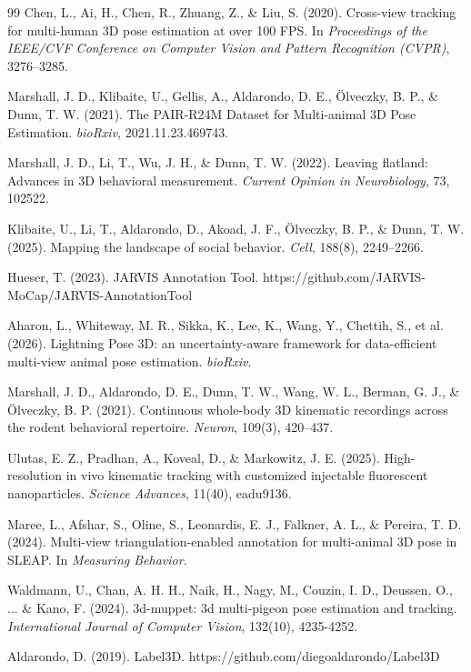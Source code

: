 \documentclass[pdflatex, sn-nature]{sn-jnl}
\theoremstyle{thmstyleone}%
\theoremstyle{thmstyletwo}%
\theoremstyle{thmstylethree}%
\begin{document}
\begin{thebibliography}{99}
 Chen, L., Ai, H., Chen, R., Zhuang, Z., \& Liu, S. (2020). Cross-view tracking for multi-human 3D pose estimation at over 100 FPS. In \textit{Proceedings of the IEEE/CVF Conference on Computer Vision and Pattern Recognition (CVPR)}, 3276--3285.

 Marshall, J. D., Klibaite, U., Gellis, A., Aldarondo, D. E., Ölveczky, B. P., \& Dunn, T. W. (2021). The PAIR-R24M Dataset for Multi-animal 3D Pose Estimation. \textit{bioRxiv}, 2021.11.23.469743.

 Marshall, J. D., Li, T., Wu, J. H., \& Dunn, T. W. (2022). Leaving flatland: Advances in 3D behavioral measurement. \textit{Current Opinion in Neurobiology}, 73, 102522.

 Klibaite, U., Li, T., Aldarondo, D., Akoad, J. F., Ölveczky, B. P., \& Dunn, T. W. (2025). Mapping the landscape of social behavior. \textit{Cell}, 188(8), 2249--2266.

 Hueser, T. (2023). JARVIS Annotation Tool. https://github.com/JARVIS-MoCap/JARVIS-AnnotationTool

 Aharon, L., Whiteway, M. R., Sikka, K., Lee, K., Wang, Y., Chettih, S., et al. (2026). Lightning Pose 3D: an uncertainty-aware framework for data-efficient multi-view animal pose estimation. \textit{bioRxiv}.

 Marshall, J. D., Aldarondo, D. E., Dunn, T. W., Wang, W. L., Berman, G. J., \& Ölveczky, B. P. (2021). Continuous whole-body 3D kinematic recordings across the rodent behavioral repertoire. \textit{Neuron}, 109(3), 420--437.

 Ulutas, E. Z., Pradhan, A., Koveal, D., \& Markowitz, J. E. (2025). High-resolution in vivo kinematic tracking with customized injectable fluorescent nanoparticles. \textit{Science Advances}, 11(40), eadu9136.

 Maree, L., Afshar, S., Oline, S., Leonardis, E. J., Falkner, A. L., \& Pereira, T. D. (2024). Multi-view triangulation-enabled annotation for multi-animal 3D pose in SLEAP. In \textit{Measuring Behavior}.

 Waldmann, U., Chan, A. H. H., Naik, H., Nagy, M., Couzin, I. D., Deussen, O., ... \& Kano, F. (2024). 3d-muppet: 3d multi-pigeon pose estimation and tracking. \textit{International Journal of Computer Vision}, 132(10), 4235-4252.

 Aldarondo, D. (2019). Label3D. https://github.com/diegoaldarondo/Label3D


\end{thebibliography}
\end{document}
